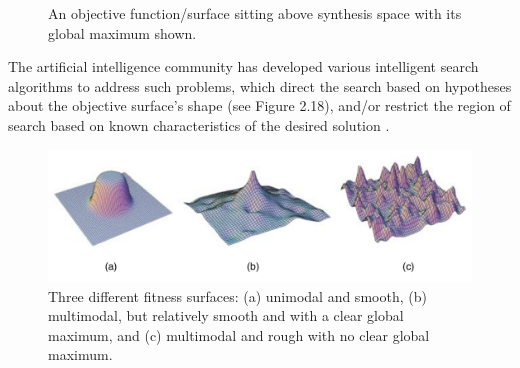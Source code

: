 \documentclass[a4paper,12pt]{report} 	%
\numberwithin{figure}{chapter}
\numberwithin{table}{chapter}
\numberwithin{equation}{chapter}
\begin{document}
\begin{flushleft}
\begin{figure}[h!]
\begin{center}
\caption[Fitness Function]{An objective function/surface sitting above synthesis space with its global maximum shown.}
\end{center}
\end{figure}
The artificial intelligence community has developed various intelligent search algorithms to address such problems, which direct the search based on hypotheses about the objective surface's shape (see Figure 2.18), and/or restrict the region of search based on known characteristics of the desired solution \cite[p. 64-108]{Russell:2009ai}.
\\
\begin{figure}[h!]
\begin{center}
\includegraphics[scale=0.6]{DifferentTopologies}
\caption[Fitness Surface Topologies]{Three different fitness surfaces: (a) unimodal and smooth, (b) multimodal, but relatively smooth and with a clear global maximum, and (c) multimodal and rough with no clear global maximum.}
\end{center}
\end{figure}

\end{flushleft}
\end{document}
